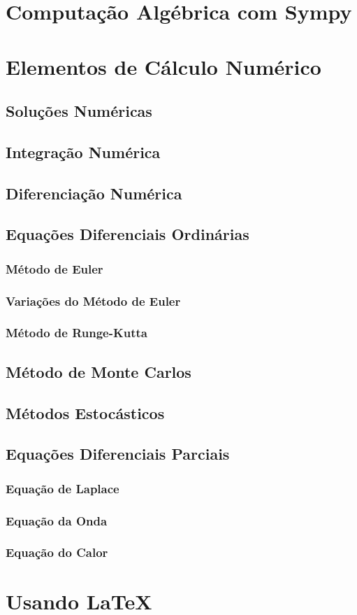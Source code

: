 \documentclass[12pt,a4paper,titlepage,portuges,twoside,final]{book}
\begin{document}
\chapter{Computação Algébrica com Sympy}


\chapter{Elementos de Cálculo Numérico}
\section{Soluções Numéricas}
\section{Integração Numérica}
\section{Diferenciação Numérica}
\section{Equações Diferenciais Ordinárias}
\subsection{Método de Euler}
\subsection{Variações do Método de Euler}
\subsection{Método de Runge-Kutta}
\section{Método de Monte Carlos}\label{sc:Monte_Carlo}
\section{Métodos Estocásticos}



\section{Equações Diferenciais Parciais}
\subsection{Equação de Laplace}
\subsection{Equação da Onda}
\subsection{Equação do Calor}

\chapter{Usando \LaTeX}\label{a:latex}



\end{document}
